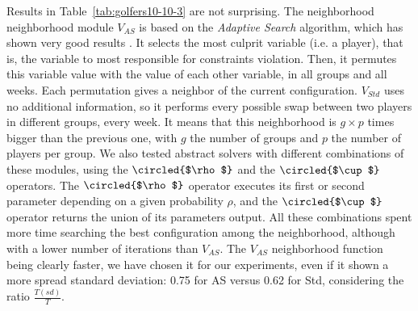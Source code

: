 Results in Table~\ref{tab:golfers10-10-3} are not surprising. The neighborhood neighborhood module $V_{AS}$ is based on the {\it Adaptive Search} algorithm, which has shown very good results \cite{Diaz}. %
It selects the most culprit variable (i.e. a player), that is, the variable to most responsible for constraints violation. Then, it permutes this variable value with the value of each other variable, in all groups and all weeks. Each permutation gives a neighbor of the current configuration. $V_{Std}$ uses no additional information, so it performs every possible swap between two players in different groups, every week. It means that this neighborhood is $g\times p$ times bigger than the previous one, with $g$ the number of groups and $p$ the number of players per group. We also tested abstract solvers with different combinations of these modules, using the $\circled{$\rho$}$ and the $\circled{$\cup$}$ operators. The $\circled{$\rho$}$ operator executes its first or second parameter depending on a given probability $\rho$, and the $\circled{$\cup$}$ operator returns the union of its parameters output. All these combinations spent more time searching the best configuration among the neighborhood, although with a lower number of iterations than $V_{AS}$. The $V_{AS}$ neighborhood function being clearly faster, we have chosen it for our experiments, even if it shown a more spread standard deviation: 0.75 for AS versus 0.62 for Std, considering the ratio $\tfrac{T(sd)}{T}$.


